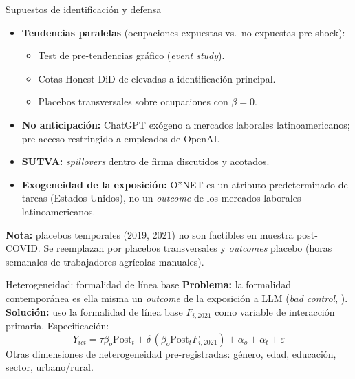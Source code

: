 \documentclass[9pt, aspectratio=169]{beamer}
\begin{document}
\begin{frame}{Supuestos de identificación y defensa}
  \small
  \begin{itemize}
    \setlength\itemsep{0.5em}
    \item \textbf{Tendencias paralelas} (ocupaciones expuestas vs.\ no expuestas pre-shock):
      \begin{itemize}
        \item Test de pre-tendencias gráfico (\emph{event study}).
        \item Cotas Honest-DiD de \citet{RambachanRoth2023_honest} elevadas a identificación principal.
        \item Placebos transversales sobre ocupaciones con $\beta = 0$.
      \end{itemize}
    \item \textbf{No anticipación:} ChatGPT exógeno a mercados laborales latinoamericanos; pre-acceso restringido a empleados de OpenAI.
    \item \textbf{SUTVA:} \emph{spillovers} dentro de firma discutidos y acotados.
    \item \textbf{Exogeneidad de la exposición:} O*NET es un atributo predeterminado de tareas (Estados Unidos), no un \emph{outcome} de los mercados laborales latinoamericanos.
  \end{itemize}
  \vfill
  \normalsize
  \textbf{Nota:} placebos temporales (2019, 2021) no son factibles en muestra post-COVID. Se reemplazan por placebos transversales y \emph{outcomes} placebo (horas semanales de trabajadores agrícolas manuales).
\end{frame}

\begin{frame}{Heterogeneidad: formalidad de línea base}
  \textbf{Problema:} la formalidad contemporánea es ella misma un \emph{outcome} de la exposición a LLM (\emph{bad control}, \citet{AbadieAIW2023_cluster}).
  \vfill
  \textbf{Solución:} uso la formalidad de línea base $F_{i, 2021}$ como variable de interacción primaria.
  \vfill
  Especificación:
  \[
    Y_{ict} = \tau\beta_o \text{Post}_t + \delta\,(\beta_o \text{Post}_t F_{i,2021}) + \alpha_o + \alpha_t + \varepsilon
  \]
  \vfill
  Otras dimensiones de heterogeneidad pre-registradas: género, edad, educación, sector, urbano/rural.
\end{frame}
\end{document}
